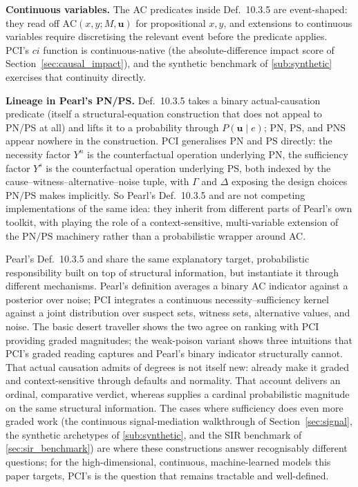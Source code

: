 \medskip\noindent\textbf{Continuous variables.}
The AC predicates inside Def.~10.3.5 are event-shaped: they read off
$\mathrm{AC}(x,y;M,\mathbf{u})$ for propositional $x, y$, and extensions to
continuous variables require discretising the relevant event before the predicate
applies. PCI's $ci$ function is continuous-native (the absolute-difference impact
score of Section~\ref{sec:causal_impact}), and the synthetic benchmark of
\cref{sub:synthetic} exercises that continuity directly.

\medskip\noindent\textbf{Lineage in Pearl's PN/PS.}
Def.~10.3.5 takes a binary actual-causation predicate (itself a
structural-equation construction that does not appeal to PN/PS at all) and lifts
it to a probability through $P(\mathbf{u}\mid e)$; $\mathrm{PN}$, $\mathrm{PS}$, and
$\mathrm{PNS}$ appear nowhere in the construction. PCI generalises
$\mathrm{PN}$ and $\mathrm{PS}$ directly: the necessity factor $Y^n$ is the
counterfactual operation underlying $\mathrm{PN}$, the sufficiency factor $Y^s$ is
the counterfactual operation underlying $\mathrm{PS}$, both indexed by the
cause--witness--alternative--noise tuple, with $\Gamma$ and $\Delta$ exposing the
design choices $\mathrm{PN}/\mathrm{PS}$ makes implicitly. So Pearl's Def.~10.3.5
and \ourapproach{} are not competing implementations of the same idea: they inherit
from different parts of Pearl's own toolkit, with \ourapproach{} playing the role of
a context-sensitive, multi-variable extension of the $\mathrm{PN}/\mathrm{PS}$
machinery rather than a probabilistic wrapper around AC.

\medskip
Pearl's Def.~10.3.5 and \ourapproach{} share the same explanatory target,
probabilistic responsibility built on top of structural information, but
instantiate it through different mechanisms. Pearl's definition averages a binary AC
indicator against a posterior over noise; PCI integrates a continuous
necessity--sufficiency kernel against a joint distribution over suspect sets,
witness sets, alternative values, and noise. The basic desert traveller shows the
two agree on ranking with PCI providing graded magnitudes; the weak-poison variant
shows three intuitions that PCI's graded reading captures and Pearl's binary
indicator structurally cannot. That actual causation admits of degrees is not itself
new: \citet{Halpern2015-HALGCA} already make it graded and context-sensitive through
defaults and normality. That account delivers an ordinal, comparative verdict,
whereas \ourapproach supplies a cardinal probabilistic magnitude on the same structural
information. The cases where sufficiency does even more graded
work (the continuous signal-mediation walkthrough of
Section~\ref{sec:signal}, the synthetic archetypes of
\cref{sub:synthetic}, and the SIR benchmark of
\cref{sec:sir_benchmark}) are where these constructions answer
recognisably different questions; for the high-dimensional, continuous,
machine-learned models this paper targets, PCI's is the question that remains
tractable and well-defined.


